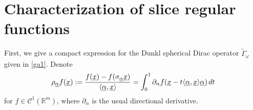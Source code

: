 \documentclass{amsart}
\theoremstyle{definition}
\theoremstyle{remark}
\numberwithin{equation}{section}
\begin{document}
\section{Characterization of slice regular functions} \label{dsu1}
First, we give a  compact expression for the Dunkl spherical Dirac operator $\widetilde{\Gamma}_{\underline{\omega}}$ given in \eqref{ga1}. Denote \begin{equation} \label{eq1}
     \rho_{\underline\alpha}f(\underline{x}):=\frac{f(\underline{x})-f(\sigma_{\underline{\alpha}} \underline{x})}{\langle \underline{\alpha}, \underline{x}\rangle}=\int_{0}^{1}\partial_{\alpha}f(\underline{x}-t\langle \underline{\alpha},
     \underline{x}\rangle \underline{\alpha})\, {\rm d}t
\end{equation}
for $f\in \mathcal{C}^{1}(\mathbb{R}^{m})$, where $\partial_{\alpha}$ is the usual
directional derivative.
\end{document}
